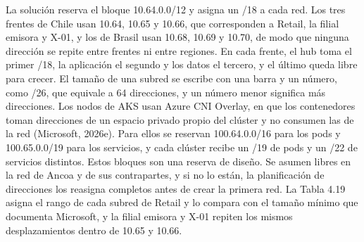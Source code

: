 \documentclass[11pt]{article}
\begin{document}
La solución reserva el bloque 10.64.0.0/12 y asigna un /18 a cada red. Los tres frentes de Chile usan 10.64, 10.65 y 10.66, que corresponden a Retail, la filial emisora y X-01, y los de Brasil usan 10.68, 10.69 y 10.70, de modo que ninguna dirección se repite entre frentes ni entre regiones. En cada frente, el hub toma el primer /18, la aplicación el segundo y los datos el tercero, y el último queda libre para crecer. El tamaño de una subred se escribe con una barra y un número, como /26, que equivale a 64 direcciones, y un número menor significa más direcciones. Los nodos de AKS usan Azure CNI Overlay, en que los contenedores toman direcciones de un espacio privado propio del clúster y no consumen las de la red (Microsoft, 2026e). Para ellos se reservan 100.64.0.0/16 para los pods y 100.65.0.0/19 para los servicios, y cada clúster recibe un /19 de pods y un /22 de servicios distintos. Estos bloques son una reserva de diseño. Se asumen libres en la red de Ancoa y de sus contrapartes, y si no lo están, la planificación de direcciones los reasigna completos antes de crear la primera red. La Tabla 4.19 asigna el rango de cada subred de Retail y lo compara con el tamaño mínimo que documenta Microsoft, y la filial emisora y X-01 repiten los mismos desplazamientos dentro de 10.65 y 10.66.

\par\vspace{0pt plus 10\baselineskip}\vspace{0pt plus -10\baselineskip}
\end{document}
